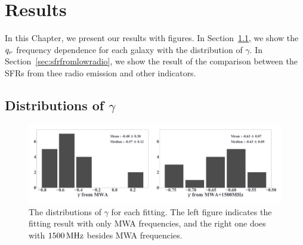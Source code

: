 \chapter{Results}\label{chap:results}
\begin{chapabstract}

In this Chapter, we present our results with figures.
In Section~\ref{sec:GammaDistribution}, we show the $q_{\nu}$ frequency dependence for each galaxy with the distribution of $\gamma$.
In Section~\ref{sec:sfrfromlowradio}, we show the result of the comparison between the SFRs from thee radio emission and other indicators.

\end{chapabstract}


%

\section{Distributions of $\gamma$}\label{sec:GammaDistribution}

\begin{figure}[htbp]
	\centering
	\includegraphics[width=\linewidth]{Chapter_5/Figures/Result_comparehist.pdf}
    \caption[Histograms of $\gamma$ from the fitting]{\label{fig:comparehist}
        The distributions of $\gamma$ for each fitting.
        The left figure indicates the fitting result with only MWA frequencies, and the right one does with $1500\,\mathrm{MHz}$ besides MWA frequencies.
    }
\end{figure}

